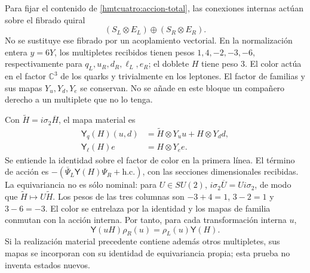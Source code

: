 Para fijar el contenido de \eqref{hmtcuatro:accion-total}, las conexiones
internas actúan sobre el fibrado quiral
\[
 (S_L\otimes E_L)\oplus(S_R\otimes E_R).
\]
No se sustituye ese fibrado por un acoplamiento vectorial. En la
normalización entera \(y=6Y\), los multipletes recibidos tienen pesos
\(1,4,-2,-3,-6\), respectivamente para \(q_L,u_R,d_R,\ell_L,e_R\);
el doblete \(H\) tiene peso \(3\). El color actúa en el factor
\(\mathbb C^3\) de los quarks y trivialmente en los leptones. El factor
de familias y sus mapas \(Y_u,Y_d,Y_e\) se conservan. No se añade en
este bloque un compañero derecho a un multiplete que no lo tenga.

Con \(\widetilde H=i\sigma_2\overline H\), el mapa material es
\begin{equation}
 \begin{split}
 \mathsf Y_q(H)(u,d)&=
       \widetilde H\otimes Y_u u+H\otimes Y_d d,\\
 \mathsf Y_\ell(H)e&=H\otimes Y_e e .
 \end{split}
 \label{hmtcuatro:yukawa}
\end{equation}
Se entiende la identidad sobre el factor de color en la primera línea.
El término de acción es
\(-(\bar\Psi_L\mathsf Y(H)\Psi_R+\mathrm{h.c.})\), con las secciones
dimensionales recibidas. La equivariancia no es sólo nominal: para
\(U\in SU(2)\), \(i\sigma_2\overline U=U i\sigma_2\), de modo que
\(\widetilde H\mapsto U\widetilde H\). Los pesos de las tres columnas
son \(-3+4=1\), \(3-2=1\) y \(3-6=-3\). El color se entrelaza por la
identidad y los mapas de familia conmutan con la acción interna.
Por tanto, para cada transformación interna \(u\),
\begin{equation}
 \mathsf Y(uH)\rho_R(u)=\rho_L(u)\mathsf Y(H).
 \label{hmtcuatro:equivariancia-yukawa}
\end{equation}
Si la realización material precedente contiene además otros
multipletes, sus mapas se incorporan con su identidad de equivariancia
propia; esta prueba no inventa estados nuevos.

